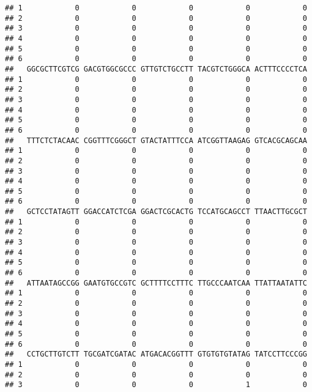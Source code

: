 \documentclass[]{article}
\begin{document}
\begin{verbatim}
## 1            0            0            0            0            0
## 2            0            0            0            0            0
## 3            0            0            0            0            0
## 4            0            0            0            0            0
## 5            0            0            0            0            0
## 6            0            0            0            0            0
##   GGCGCTTCGTCG GACGTGGCGCCC GTTGTCTGCCTT TACGTCTGGGCA ACTTTCCCCTCA
## 1            0            0            0            0            0
## 2            0            0            0            0            0
## 3            0            0            0            0            0
## 4            0            0            0            0            0
## 5            0            0            0            0            0
## 6            0            0            0            0            0
##   TTTCTCTACAAC CGGTTTCGGGCT GTACTATTTCCA ATCGGTTAAGAG GTCACGCAGCAA
## 1            0            0            0            0            0
## 2            0            0            0            0            0
## 3            0            0            0            0            0
## 4            0            0            0            0            0
## 5            0            0            0            0            0
## 6            0            0            0            0            0
##   GCTCCTATAGTT GGACCATCTCGA GGACTCGCACTG TCCATGCAGCCT TTAACTTGCGCT
## 1            0            0            0            0            0
## 2            0            0            0            0            0
## 3            0            0            0            0            0
## 4            0            0            0            0            0
## 5            0            0            0            0            0
## 6            0            0            0            0            0
##   ATTAATAGCCGG GAATGTGCCGTC GCTTTTCCTTTC TTGCCCAATCAA TTATTAATATTC
## 1            0            0            0            0            0
## 2            0            0            0            0            0
## 3            0            0            0            0            0
## 4            0            0            0            0            0
## 5            0            0            0            0            0
## 6            0            0            0            0            0
##   CCTGCTTGTCTT TGCGATCGATAC ATGACACGGTTT GTGTGTGTATAG TATCCTTCCCGG
## 1            0            0            0            0            0
## 2            0            0            0            0            0
## 3            0            0            0            1            0

\end{verbatim}
\end{document}
